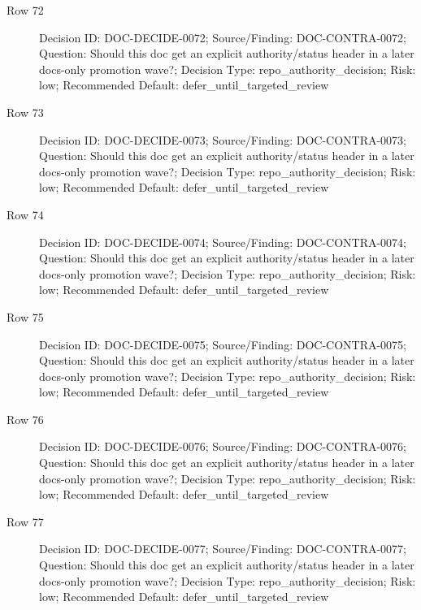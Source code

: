 \documentclass[9pt,a4paper,openany]{book}
\begin{document}
\begin{description}
\item[Row 72] Decision ID: DOC-\allowbreak{}DECIDE-\allowbreak{}0072; Source/\allowbreak{}Finding: DOC-\allowbreak{}CONTRA-\allowbreak{}0072; Question: Should this doc get an explicit authority/\allowbreak{}status header in a later docs-\allowbreak{}only promotion wave?; Decision Type: repo\_\allowbreak{}authority\_\allowbreak{}decision; Risk: low; Recommended Default: defer\_\allowbreak{}until\_\allowbreak{}targeted\_\allowbreak{}review
\item[Row 73] Decision ID: DOC-\allowbreak{}DECIDE-\allowbreak{}0073; Source/\allowbreak{}Finding: DOC-\allowbreak{}CONTRA-\allowbreak{}0073; Question: Should this doc get an explicit authority/\allowbreak{}status header in a later docs-\allowbreak{}only promotion wave?; Decision Type: repo\_\allowbreak{}authority\_\allowbreak{}decision; Risk: low; Recommended Default: defer\_\allowbreak{}until\_\allowbreak{}targeted\_\allowbreak{}review
\item[Row 74] Decision ID: DOC-\allowbreak{}DECIDE-\allowbreak{}0074; Source/\allowbreak{}Finding: DOC-\allowbreak{}CONTRA-\allowbreak{}0074; Question: Should this doc get an explicit authority/\allowbreak{}status header in a later docs-\allowbreak{}only promotion wave?; Decision Type: repo\_\allowbreak{}authority\_\allowbreak{}decision; Risk: low; Recommended Default: defer\_\allowbreak{}until\_\allowbreak{}targeted\_\allowbreak{}review
\item[Row 75] Decision ID: DOC-\allowbreak{}DECIDE-\allowbreak{}0075; Source/\allowbreak{}Finding: DOC-\allowbreak{}CONTRA-\allowbreak{}0075; Question: Should this doc get an explicit authority/\allowbreak{}status header in a later docs-\allowbreak{}only promotion wave?; Decision Type: repo\_\allowbreak{}authority\_\allowbreak{}decision; Risk: low; Recommended Default: defer\_\allowbreak{}until\_\allowbreak{}targeted\_\allowbreak{}review
\item[Row 76] Decision ID: DOC-\allowbreak{}DECIDE-\allowbreak{}0076; Source/\allowbreak{}Finding: DOC-\allowbreak{}CONTRA-\allowbreak{}0076; Question: Should this doc get an explicit authority/\allowbreak{}status header in a later docs-\allowbreak{}only promotion wave?; Decision Type: repo\_\allowbreak{}authority\_\allowbreak{}decision; Risk: low; Recommended Default: defer\_\allowbreak{}until\_\allowbreak{}targeted\_\allowbreak{}review
\item[Row 77] Decision ID: DOC-\allowbreak{}DECIDE-\allowbreak{}0077; Source/\allowbreak{}Finding: DOC-\allowbreak{}CONTRA-\allowbreak{}0077; Question: Should this doc get an explicit authority/\allowbreak{}status header in a later docs-\allowbreak{}only promotion wave?; Decision Type: repo\_\allowbreak{}authority\_\allowbreak{}decision; Risk: low; Recommended Default: defer\_\allowbreak{}until\_\allowbreak{}targeted\_\allowbreak{}review

\end{description}
\end{document}
